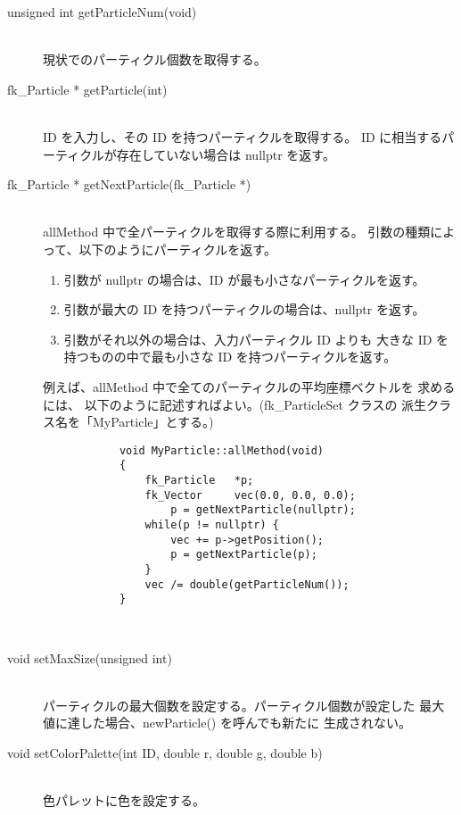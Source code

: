 \begin{description}
\item[unsigned int getParticleNum(void)] ~ \\
	現状でのパーティクル個数を取得する。\\

\item[fk\_Particle * getParticle(int)] ~ \\
	ID を入力し、その ID を持つパーティクルを取得する。
	ID に相当するパーティクルが存在していない場合は nullptr を返す。\\

\item[fk\_Particle * getNextParticle(fk\_Particle *)] ~ \\
	allMethod 中で全パーティクルを取得する際に利用する。
	引数の種類によって、以下のようにパーティクルを返す。
	\begin{enumerate}
	 \item 引数が nullptr の場合は、ID が最も小さなパーティクルを返す。
	 \item 引数が最大の ID を持つパーティクルの場合は、nullptr を返す。
	 \item 引数がそれ以外の場合は、入力パーティクル ID よりも
		大きな ID を持つものの中で最も小さな ID を持つパーティクルを返す。
	\end{enumerate}
	例えば、allMethod 中で全てのパーティクルの平均座標ベクトルを
	求めるには、
	以下のように記述すればよい。(fk\_ParticleSet クラスの
	派生クラス名を「MyParticle」とする。) \\
	\begin{screen}
	\begin{verbatim}
	        void MyParticle::allMethod(void)
	        {
	            fk_Particle   *p;
	            fk_Vector     vec(0.0, 0.0, 0.0);
		            p = getNextParticle(nullptr);
	            while(p != nullptr) {
	                vec += p->getPosition();
	                p = getNextParticle(p);
	            }
	            vec /= double(getParticleNum());
	        }
	\end{verbatim}
	\end{screen} \\

\item[void setMaxSize(unsigned int)] ~ \\
	パーティクルの最大個数を設定する。パーティクル個数が設定した
	最大値に達した場合、newParticle() を呼んでも新たに
	生成されない。\\

\item[void setColorPalette(int ID, double r, double g, double b)] ~ \\
	色パレットに色を設定する。
\end{description}

